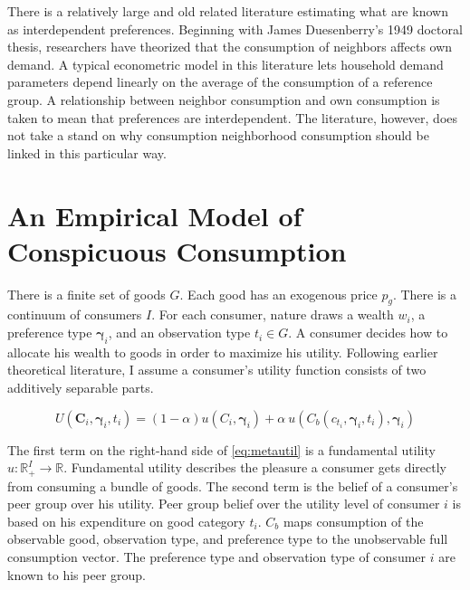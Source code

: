 There is a relatively large and old related literature estimating what are known as interdependent preferences.  Beginning with James Duesenberry's 1949 doctoral thesis,\citep{Duesenberry1949} researchers have theorized that the consumption of neighbors affects own demand.  A typical econometric model in this literature lets household demand parameters depend linearly on the average of the consumption of a reference group. A relationship between neighbor consumption and own consumption is taken to mean that preferences are interdependent.  The literature, however, does not take a stand on why consumption neighborhood consumption should be linked in this particular way.

\section{An Empirical Model of Conspicuous Consumption}

There is a finite set of goods $G$.  Each good has an exogenous price $p_g$.  There is a continuum of consumers $I$. For each consumer, nature draws a wealth $w_i$, a preference type $\boldsymbol{\gamma}_i$, and an observation type $t_i \in G$.  A consumer decides how to allocate his wealth to goods in order to maximize his utility.  Following earlier theoretical literature,\citep{Heffetz2011,Ireland1994} I assume a consumer's utility function consists of two additively separable parts.

\begin{equation}
    \label{eq:metautil}
    U(\mathbf{C}_i,\boldsymbol{\gamma}_i,t_i) = (1-\alpha) u(C_i,\boldsymbol{\gamma}_i) + \alpha\  u(C_b(c_{t_i},\boldsymbol{\gamma}_i,t_i),\boldsymbol{\gamma}_i)
\end{equation}

The first term on the right-hand side of \eqref{eq:metautil} is a fundamental utility $u:\mathbb{R}_+^{I}\rightarrow\mathbb{R}$.  
Fundamental utility describes the pleasure a consumer gets directly from consuming a bundle of goods.
The second term is the belief of a consumer's peer group over his utility.  Peer group belief over the utility level of consumer $i$ is based on his expenditure on good category $t_i$.  $C_b$ maps consumption of the observable good, observation type, and preference type to the unobservable full consumption vector.  The preference type and observation type of consumer $i$ are known to his peer group.\footnotemark{}

